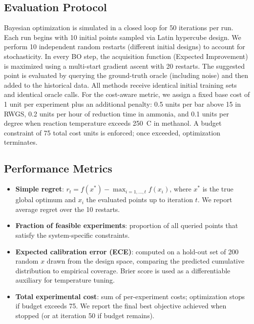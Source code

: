\documentclass{article}
\begin{document}
\subsection{Evaluation Protocol}
Bayesian optimization is simulated in a closed loop for 50 iterations per run. Each run begins with 10 initial points sampled via Latin hypercube design. We perform 10 independent random restarts (different initial designs) to account for stochasticity. In every BO step, the acquisition function (Expected Improvement) is maximized using a multi-start gradient ascent with 20 restarts. The suggested point is evaluated by querying the ground-truth oracle (including noise) and then added to the historical data. All methods receive identical initial training sets and identical oracle calls. For the cost-aware metric, we assign a fixed base cost of 1 unit per experiment plus an additional penalty: 0.5 units per bar above 15 in RWGS, 0.2 units per hour of reduction time in ammonia, and 0.1 units per degree when reaction temperature exceeds 250~\textdegree C in methanol. A budget constraint of 75 total cost units is enforced; once exceeded, optimization terminates.

\subsection{Performance Metrics}
\begin{itemize}
    \item \textbf{Simple regret}: \(r_t = f(x^*) - \max_{i=1,\dots,t} f(x_i)\), where \(x^*\) is the true global optimum and \(x_i\) the evaluated points up to iteration \(t\). We report average regret over the 10 restarts.
    \item \textbf{Fraction of feasible experiments}: proportion of all queried points that satisfy the system-specific constraints.
    \item \textbf{Expected calibration error (ECE)}: computed on a hold-out set of 200 random \(x\) drawn from the design space, comparing the predicted cumulative distribution to empirical coverage. Brier score is used as a differentiable auxiliary for temperature tuning.
    \item \textbf{Total experimental cost}: sum of per-experiment costs; optimization stops if budget exceeds 75. We report the final best objective achieved when stopped (or at iteration 50 if budget remains).
\end{itemize}
\end{document}
